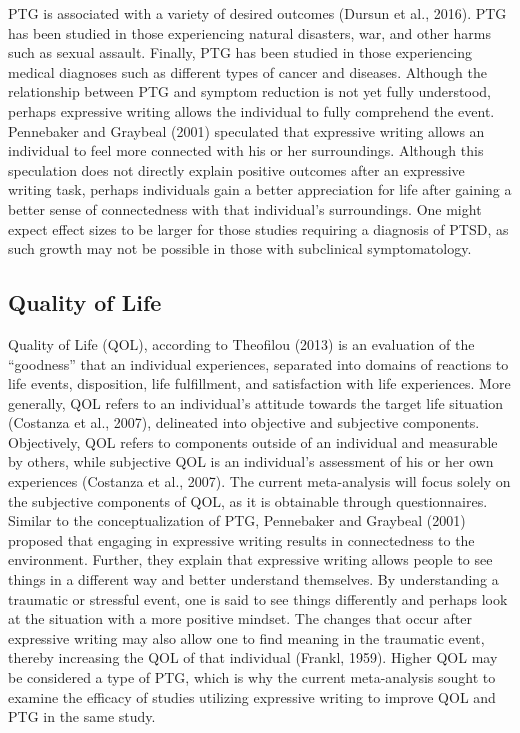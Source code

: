 \documentclass[,man]{apa6}
\begin{document}
PTG is associated with a variety of desired outcomes (Dursun et al., 2016). PTG has been studied in those experiencing natural disasters, war, and other harms such as sexual assault. Finally, PTG has been studied in those experiencing medical diagnoses such as different types of cancer and diseases. Although the relationship between PTG and symptom reduction is not yet fully understood, perhaps expressive writing allows the individual to fully comprehend the event. Pennebaker and Graybeal (2001) speculated that expressive writing allows an individual to feel more connected with his or her surroundings. Although this speculation does not directly explain positive outcomes after an expressive writing task, perhaps individuals gain a better appreciation for life after gaining a better sense of connectedness with that individual's surroundings. One might expect effect sizes to be larger for those studies requiring a diagnosis of PTSD, as such growth may not be possible in those with subclinical symptomatology.

\hypertarget{quality-of-life}{%
\subsection{Quality of Life}\label{quality-of-life}}

Quality of Life (QOL), according to Theofilou (2013) is an evaluation of the \enquote{goodness} that an individual experiences, separated into domains of reactions to life events, disposition, life fulfillment, and satisfaction with life experiences. More generally, QOL refers to an individual's attitude towards the target life situation (Costanza et al., 2007), delineated into objective and subjective components. Objectively, QOL refers to components outside of an individual and measurable by others, while subjective QOL is an individual's assessment of his or her own experiences (Costanza et al., 2007). The current meta-analysis will focus solely on the subjective components of QOL, as it is obtainable through questionnaires. Similar to the conceptualization of PTG, Pennebaker and Graybeal (2001) proposed that engaging in expressive writing results in connectedness to the environment. Further, they explain that expressive writing allows people to see things in a different way and better understand themselves. By understanding a traumatic or stressful event, one is said to see things differently and perhaps look at the situation with a more positive mindset. The changes that occur after expressive writing may also allow one to find meaning in the traumatic event, thereby increasing the QOL of that individual (Frankl, 1959). Higher QOL may be considered a type of PTG, which is why the current meta-analysis sought to examine the efficacy of studies utilizing expressive writing to improve QOL and PTG in the same study.
\newline
\newline
\end{document}
